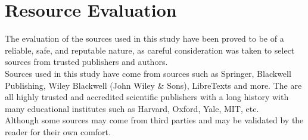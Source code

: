 \chapter{Resource Evaluation}\label{ch05}

The evaluation of the sources used in this study have been proved to be of a reliable, safe, and reputable nature, as careful consideration was taken to select sources from trusted publishers and authors. \\
Sources used in this study have come from sources such as Springer, Blackwell Publishing, Wiley Blackwell (John Wiley \& Sons), LibreTexts and more. The are all highly trusted and accredited scientific publishers with a long history with many educational institutes such as Harvard, Oxford, Yale, MIT, etc. \\
Although some sources may come from third parties and may be validated by the reader for their own comfort.
